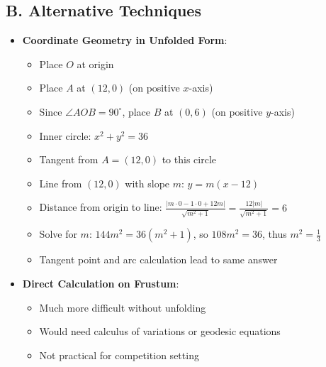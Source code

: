 \documentclass[12pt]{article}
\begin{document}
\begin{techniquesbox}
\subsection*{B. Alternative Techniques}
\begin{itemize}[leftmargin=*]
    \item \textbf{Coordinate Geometry in Unfolded Form}:
    \begin{itemize}
        \item Place $O$ at origin
        \item Place $A$ at $(12, 0)$ (on positive $x$-axis)
        \item Since $\angle AOB = 90^\circ$, place $B$ at $(0, 6)$ (on positive $y$-axis)
        \item Inner circle: $x^2 + y^2 = 36$
        \item Tangent from $A = (12, 0)$ to this circle
        \item Line from $(12, 0)$ with slope $m$: $y = m(x - 12)$
        \item Distance from origin to line: $\frac{|m \cdot 0 - 1 \cdot 0 + 12m|}{\sqrt{m^2 + 1}} = \frac{12|m|}{\sqrt{m^2+1}} = 6$
        \item Solve for $m$: $144m^2 = 36(m^2 + 1)$, so $108m^2 = 36$, thus $m^2 = \frac{1}{3}$
        \item Tangent point and arc calculation lead to same answer
    \end{itemize}
    \item \textbf{Direct Calculation on Frustum}:
    \begin{itemize}
        \item Much more difficult without unfolding
        \item Would need calculus of variations or geodesic equations
        \item Not practical for competition setting
    \end{itemize}
\end{itemize}


\end{techniquesbox}
\end{document}
